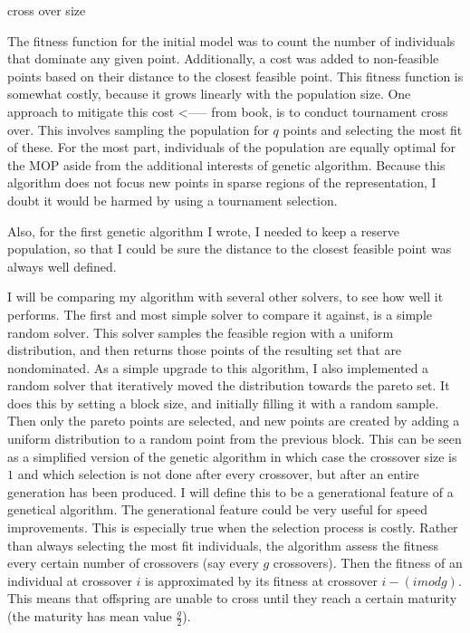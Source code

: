 \documentclass{article}
\begin{document}
{{cross over size

The fitness function for the initial model was to count the number of individuals that dominate any given point.
Additionally, a cost was added to non-feasible points based on their distance to the closest feasible point.
This fitness function is somewhat costly, because it grows linearly with the population size.
One approach to mitigate this cost <----- from book, is to conduct tournament cross over.
This involves sampling the population for $q$ points and selecting the most fit of these.
For the most part, individuals of the population are equally optimal for the MOP aside from the additional interests of genetic algorithm.
Because this algorithm does not focus new points in sparse regions of the representation, I doubt it would be harmed by using a tournament selection.

Also, for the first genetic algorithm I wrote, I needed to keep a reserve population, so that I could be sure the 
distance to the closest feasible point was always well defined.

I will be comparing my algorithm with several other solvers, to see how well it performs.
The first and most simple solver to compare it against, is a simple random solver.
This solver samples the feasible region with a uniform distribution, and then returns those points of the resulting set that are nondominated.
As a simple upgrade to this algorithm, I also implemented a random solver that iteratively moved the distribution towards the pareto set.
It does this by setting a block size, and initially filling it with a random sample.
Then only the pareto points are selected, and new points are created by adding a uniform distribution to a random point from the previous block.
This can be seen as a simplified version of the genetic algorithm in which case the crossover size is $1$ and which selection is not done after every crossover, 
but after an entire generation has been produced.
I will define this to be a generational feature of a genetical algorithm.
The generational feature could be very useful for speed improvements.
This is especially true when the selection process is costly.
Rather than always selecting the most fit individuals, the algorithm assess the fitness every certain number of crossovers (say every $g$ crossovers).
Then the fitness of an individual at crossover $i$ is approximated by its fitness at crossover $i - (i mod g)$.
This means that offspring are unable to cross until they reach a certain maturity (the maturity has mean value $\frac g 2$).

}}
\end{document}
